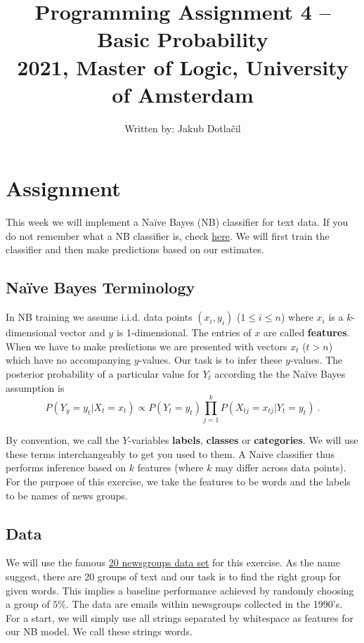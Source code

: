 \documentclass[11pt, a4paper]{article}
\title{Programming Assignment 4 -- Basic Probability\\
2021, Master of Logic, University of Amsterdam}
\author{Written by: Jakub Dotla\v{c}il}
\date{}
\begin{document}
\maketitle

\section{Assignment}

This week we will implement a Na\"ive Bayes (NB) classifier for text data. If you do not remember what a 
NB classifier is, check \href{https://github.com/BasicProbability/LectureNotes/blob/master/chapter4/chapter4.pdf}{here}. 
We will first train the classifier and then make predictions based on our estimates.

\subsection{Na\"ive Bayes Terminology}

In NB training we assume i.i.d. data points $ (x_{i},y_{i}) $ ($ 1 \leq i \leq n $) where $ x_{i} $ is a $ k $-dimensional vector and
$ y $ is 1-dimensional. The entries of $ x $ are called \textbf{features}. When we have to make predictions we are presented with vectors
$ x_{t} $ ($ t > n $) which have no accompanying $ y $-values. Our task is to infer these $ y $-values. The posterior probability of a particular value
for $ Y_{t} $ according the the Na\"ive Bayes assumption is
\begin{equation}
P(Y_{y} = y_{t}|X_{t} = x_{t}) \propto P(Y_{t} = y_{t}) \prod_{j=1}^{k}P(X_{tj} = x_{tj}|Y_{t} = y_{t}) \ .
\end{equation}

By convention, we call the $ Y $-variables \textbf{labels}, \textbf{classes} or \textbf{categories}. We will use these terms interchangeably to get you used
to them. A Naive classifier thus performs inference based on $ k $ features (where $ k $ may differ across data points). For the purpose of this exercise, we take the 
features to be words and the labels to be names of news groups.

\subsection{Data}

We will use the famous \href{http://qwone.com/~jason/20Newsgroups/}{20 newsgroups data set} for this 
exercise. As the name suggest, there are 20 groups of text and our task is to find the right group for given words. This
implies a baseline performance achieved by randomly choosing a group of $ 5\% $. The data are emails
within newsgroups collected in the 1990's. For a start, we will simply use all strings separated by
whitespace as features for our NB model. We call these strings words.
\end{document}

